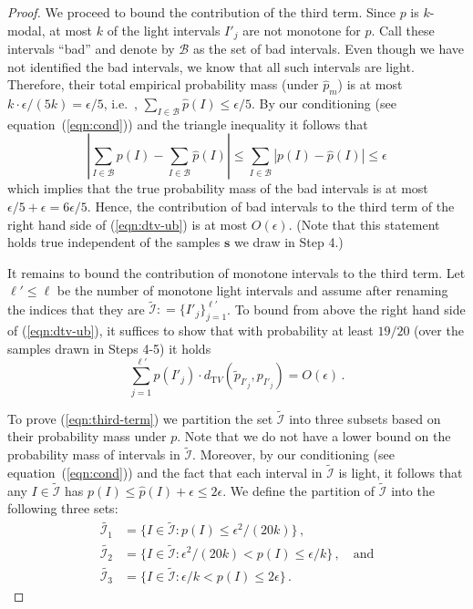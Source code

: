 \documentclass[10pt]{article}
\theoremstyle{definition}
\providecommand{\ie}{i.e.\ }
\numberwithin{equation}{section}
\newcommand{\dtv}{d_{\mathrm TV}}
\newcommand{\eps}{\epsilon}
\begin{document}
\begin{proof}
We proceed to bound the contribution of the third term. Since $p$ is $k$-modal,
at most $k$ of the light intervals $I'_j$ are not monotone for $p$. Call
these intervals ``bad'' and denote by $\mathcal{B}$ as the set of bad intervals.
Even though we have not identified the bad intervals, we know that all such
intervals are light. Therefore, {their total empirical probability mass (under $\widehat{p}_m$)
is at most $k \cdot \eps/(5k) = \eps/5$, \ie, $\sum_{I \in \mathcal{B}} \widehat{p}(I) \le \eps/5$. 
By our conditioning  {(see equation~(\ref{eqn:cond}))} and the triangle inequality it follows that 
$$\left|  \sum_{I \in \mathcal{B}} p(I)  -  \sum_{I \in \mathcal{B}} \widehat{p}(I)  \right|  \le   \sum_{I \in \mathcal{B}} \left| p(I) - \widehat{p}(I)  \right| \le \eps$$
which implies that the true probability mass of the bad intervals is at most $\eps/5+\eps = 6\eps/5$.
Hence, the contribution of bad intervals to the third term of the right hand side of (\ref{eqn:dtv-ub}) is at
most $O(\eps)$.}  (Note that this statement holds true independent of the
samples $\mathbf{s}$ we draw in Step 4.) 

It remains to bound the contribution of monotone intervals to the third term.
Let $\ell' \leq \ell$ be the number of monotone light intervals and
assume after renaming the indices that they are $\widetilde{\mathcal{I}} : = \{I'_j\}_{j=1}^{\ell'}$.
To bound from above the right hand side of (\ref{eqn:dtv-ub}), it suffices to show that with probability
at least $19/20$ (over the samples drawn in Steps 4-5) it holds
\begin{equation} \label{eqn:third-term}
\sum_{j=1}^{\ell'} p(I'_j) \cdot \dtv (\widetilde{p}_{I'_j}, p_{I'_j}) = O(\eps)\,.
\end{equation}


{\noindent To prove (\ref{eqn:third-term}) we
partition the set $\widetilde{\mathcal{I}}$  {into} three subsets based on their probability mass under $p$. 
Note that we do not have a lower bound
on the probability mass of intervals in $\widetilde{\mathcal{I}}$.
Moreover, by our conditioning  {(see equation~(\ref{eqn:cond}))} and  {the fact that each interval in $\widetilde{\mathcal{I}}$ is light,} it follows that any $I \in \widetilde{\mathcal{I}}$ has 
$p(I) \le \widehat{p}(I)+\eps \le 2\eps$. We define the partition of $\widetilde{\mathcal{I}}$ into the following three sets:
\begin{align*}
  \widetilde{\mathcal{I}_1} &= \{ I \in  \widetilde{\mathcal{I}}: p(I) \le \eps^2/(20k)\}\,,\\
  \widetilde{\mathcal{I}_2} &= \{ I \in  \widetilde{\mathcal{I}}: \eps^2/(20k) < p(I) \le \eps/k\}\,,\quad\text{and}\\
\widetilde{\mathcal{I}_3} &= \{ I \in  \widetilde{\mathcal{I}}:
                            \eps/k < p(I) \le  2\eps \}\,.
\end{align*} 

}
\end{proof}
\end{document}
